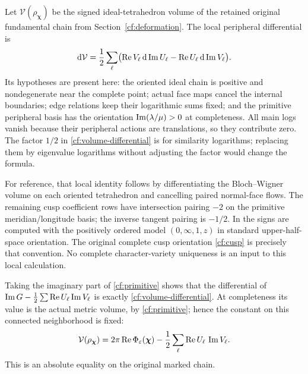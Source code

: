 Let $\mathcal V(\rho_{\boldsymbol\chi})$ be the signed
ideal-tetrahedron volume of the retained original fundamental
chain from Section~\ref{cf:deformation}.
The local peripheral differential
\cite[equation~(7.3)]{Marked} is
\begin{equation}\label{cf:volume-differential}
 \mathrm d\mathcal V
 =\frac12\sum_\ell
    \bigl(\operatorname{Re} V_\ell\,\mathrm d\operatorname{Im} U_\ell
                 -\operatorname{Re} U_\ell\,\mathrm d\operatorname{Im} V_\ell\bigr).
\end{equation}
Its hypotheses are present here: the oriented ideal chain is
positive and nondegenerate near the complete point; actual
face maps cancel the internal boundaries; edge relations
keep their logarithmic sums fixed; and the primitive
peripheral basis has the orientation
$\operatorname{Im}(\lambda/\mu)>0$ at completeness.
All main logs vanish because their peripheral actions are
translations, so they contribute zero.
The factor $1/2$ in \eqref{cf:volume-differential} is for
similarity logarithms; replacing them by eigenvalue logarithms
without adjusting the factor would change the formula.

For reference, that local identity follows by differentiating
the Bloch--Wigner volume on each oriented tetrahedron and
cancelling paired normal-face flows. The remaining cusp
coefficient rows have intersection pairing $-2$ on the
primitive meridian/longitude basis; the inverse tangent
pairing is $-1/2$. In \cite[Section~7.1]{Marked} the signs
are computed with the positively ordered model
$(0,\infty,1,z)$ in standard upper-half-space orientation.
The original complete cusp orientation
\eqref{cf:cusp} is precisely that convention.
No complete character-variety uniqueness is an input to
this local calculation.

Taking the imaginary part of \eqref{cf:primitive} shows that
the differential of
$\operatorname{Im} G-\frac12\sum\operatorname{Re} U_\ell\operatorname{Im} V_\ell$
is exactly \eqref{cf:volume-differential}.
At completeness its value is the actual metric volume,
by \eqref{cf:primitive}; hence the constant on this connected
neighborhood is fixed:
\begin{equation}\label{cf:regulator}
 \mathcal V(\rho_{\boldsymbol\chi})
   =2\pi\operatorname{Re}\Phi_\varepsilon(\boldsymbol\chi)
          -\frac12\sum_\ell\operatorname{Re} U_\ell\,\operatorname{Im} V_\ell .
\end{equation}
This is an absolute equality on the original marked chain.

